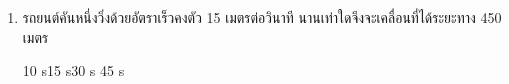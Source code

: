 \begin{enumerate}
	\item \runningj \nonet รถยนต์คันหนึ่งวิ่งด้วยอัตราเร็วคงตัว   15  เมตรต่อวินาที    นานเท่าใดจึงจะเคลื่อนที่ได้ระยะทาง  450  เมตร
	\begin{4c}
		{10 s}{15 s}{30 s }{45 s}
	\end{4c}
\end{enumerate}
